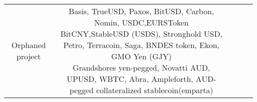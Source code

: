 \begin{table}[h!]
\begin{tabular}{|c|c|c|c|l|}
                                                                                                                 
                                                                                                                 
Orphaned project & \shortstack{Basis, TrueUSD, Paxos, BitUSD, Carbon, Nomin, USDC,EURSToken   \\ BitCNY,StableUSD (USDS), Stronghold USD, Petro, Terracoin, Saga, BNDES token, Ekon, GMO Yen (GJY) \\ Grandshores yen-pegged, Novatti AUD, UPUSD, WBTC, Abra, Ampleforth,  AUD-pegged collateralized stablecoin(emparta) }
                                                                                                                 


\end{tabular}
\end{table}

